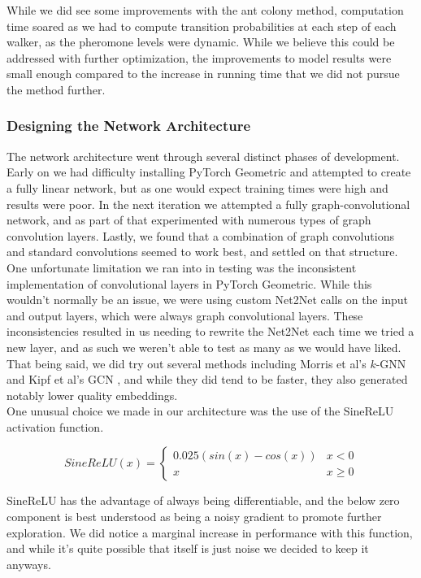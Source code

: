 \documentclass[12pt,twoside]{report}
\begin{document}
While we did see some improvements with the ant colony method, computation time soared as we had to compute transition probabilities at each step of each walker, as the pheromone levels were dynamic. While we believe this could be addressed with further optimization, the improvements to model results were small enough compared to the increase in running time that we did not pursue the method further. \\

\subsubsection{Designing the Network Architecture}

The network architecture went through several distinct phases of development. Early on we had difficulty installing PyTorch Geometric and attempted to create a fully linear network, but as one would expect training times were high and results were poor. In the next iteration we attempted a fully graph-convolutional network, and as part of that experimented with numerous types of graph convolution layers. Lastly, we found that a combination of graph convolutions and standard convolutions seemed to work best, and settled on that structure. \\

One unfortunate limitation we ran into in testing was the inconsistent implementation of convolutional layers in PyTorch Geometric. While this wouldn't normally be an issue, we were using custom Net2Net calls on the input and output layers, which were always graph convolutional layers. These inconsistencies resulted in us needing to rewrite the Net2Net each time we tried a new layer, and as such we weren't able to test as many as we would have liked. That being said, we did try out several methods including  Morris et al's $k$-GNN \cite{morris2019weisfeiler} and Kipf et al's GCN \cite{kipf2016semi}, and while they did tend to be faster, they also generated notably lower quality embeddings. \\

One unusual choice we made in our architecture was the use of the SineReLU activation function. 

\[ SineReLU(x) =  \begin{cases} 
          0.025(sin(x) - cos(x)) & x < 0 \\
          x & x\geq 0
       \end{cases} \]
       
SineReLU has the advantage of always being differentiable, and the below zero component is best understood as being a noisy gradient to promote further exploration. We did notice a marginal increase in performance with this function, and while it's quite possible that itself is just noise we decided to keep it anyways. \\
\end{document}
